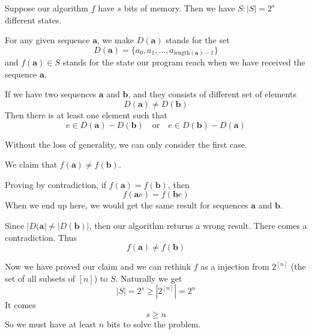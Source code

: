 Suppose our algorithm $f$ have $s$ bits of memory. Then we have $S:|S|=2^s$ different states.

For any given sequence $\mathbf{a}$, we make $D(\mathbf{a})$ stands for the set
\[
	D(\mathbf{a}) = \{a_0,a_1,\ldots,a_{\mathrm{length}(\mathbf{a})-1}\}
\]
and $f(\mathbf{a})\in S$ stands for the state our program reach when we have received the sequence $\mathbf{a}$.

If we have two sequences $\mathbf{a}$ and $\mathbf{b}$, and they consists of different set of elements
\[
	D(\mathbf{a})\neq D(\mathbf{b})
\]
Then there is at least one element such that
\[
	e\in D(\mathbf{a})-D(\mathbf{b})\quad\mathrm{or}\quad e\in D(\mathbf{b})-D(\mathbf{a})
\]

Without the loss of generality, we can only consider the first case.

We claim that $f(\mathbf{a})\neq f(\mathbf{b})$.

Proving by contradiction, if $f(\mathbf{a})=f(\mathbf{b})$, then
\[
	f(\mathbf{a}e)=f(\mathbf{b}e)
\]
When we end up here, we would get the same result for sequences $\mathbf{a}$ and $\mathbf{b}$.

Since $|D(\mathbf{a}|\neq|D(\mathbf{b})|$, then our algorithm returns a wrong result. There comes a contradiction. Thus
\[
	f(\mathbf{a})\neq f(\mathbf{b})
\]

Now we have proved our claim and we can rethink $f$ as a injection from $2^{[n]}$ (the set of all subsets of $[n]$) to $S$. Naturally we get
\[
	|S|=2^s\geq|2^[n]|=2^n
\]
It comes
\[
	s\geq n
\]
So we must have at least $n$ bits to solve the problem.
